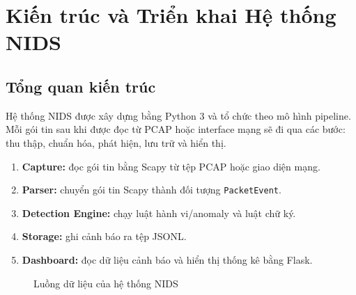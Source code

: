 \chapter{Kiến trúc và Triển khai Hệ thống NIDS}

\section{Tổng quan kiến trúc}
Hệ thống NIDS được xây dựng bằng Python 3 và tổ chức theo mô hình pipeline. Mỗi gói tin sau khi được đọc từ PCAP hoặc interface mạng sẽ đi qua các bước: thu thập, chuẩn hóa, phát hiện, lưu trữ và hiển thị.

\begin{enumerate}
    \item \textbf{Capture:} đọc gói tin bằng Scapy từ tệp PCAP hoặc giao diện mạng.
    \item \textbf{Parser:} chuyển gói tin Scapy thành đối tượng \texttt{PacketEvent}.
    \item \textbf{Detection Engine:} chạy luật hành vi/anomaly và luật chữ ký.
    \item \textbf{Storage:} ghi cảnh báo ra tệp JSONL.
    \item \textbf{Dashboard:} đọc dữ liệu cảnh báo và hiển thị thống kê bằng Flask.
\end{enumerate}

\begin{figure}[h!]
    \centering
    \caption{Luồng dữ liệu của hệ thống NIDS}
    \label{fig:nids_architecture}
\end{figure}

